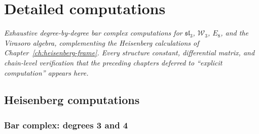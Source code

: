 \chapter{Detailed computations}
\label{chap:detailed-computations}


\noindent\emph{Exhaustive degree-by-degree bar complex computations for $\mathfrak{sl}_3$, $\mathcal{W}_3$, $E_8$, and the Virasoro algebra, complementing the Heisenberg calculations of Chapter~\ref{ch:heisenberg-frame}.  Every structure constant, differential matrix, and chain-level verification that the preceding chapters deferred to ``explicit computation'' appears here.}

\section{Heisenberg computations}
\label{sec:heisenberg-details}

\subsection{Bar complex: degrees 3 and 4}


